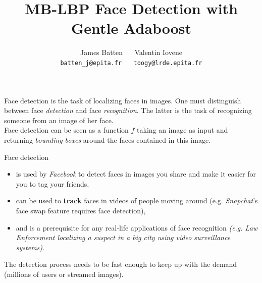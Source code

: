 \documentclass[10pt]{article}
\begin{document}

\title{
    MB-LBP Face Detection with Gentle Adaboost
}

\author{
    James Batten $\quad$ Valentin Iovene \\
    \texttt{batten\_j@epita.fr} $\quad$ \texttt{toogy@lrde.epita.fr}
}

\def\tightlist{}

\begin{titlingpage}
    \maketitle

    Face detection is the task of localizing faces in images. One must
    distinguish between face \emph{detection} and face \emph{recognition}. The
    latter is the task of recognizing someone from an image of her face. \\

    Face detection can be seen as a function $f$ taking an image as input and
    returning \emph{bounding boxes} around the faces contained in this image. \\

    \begin{center}
        
    \end{center}

    Face detection

    \begin{itemize}

        \item is used by \emph{Facebook} to detect faces in images you share and
            make it easier for you to tag your friends,

        \item can be used to \textbf{track} faces in videos of people moving
            around (e.g. \emph{Snapchat}'s face swap feature requires face
            detection),

        \item and is a prerequisite for any real-life applications of face
            recognition \emph{(e.g. Law Enforcement localizing a suspect in a
            big city using video surveillance systems)}.

    \end{itemize}

    The detection process needs to be fast enough to keep up with the demand
    (millions of users or streamed images). \\


\end{titlingpage}
\end{document}
